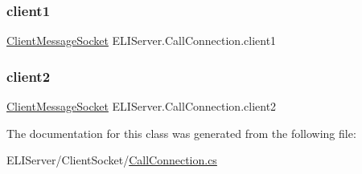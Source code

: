 \subsubsection{\texorpdfstring{client1}{client1}}
{\footnotesize\ttfamily \hyperlink{class_e_l_i_server_1_1_messaging_1_1_client_message_socket}{Client\+Message\+Socket} E\+L\+I\+Server.\+Call\+Connection.\+client1\hspace{0.3cm}{\ttfamily [private]}}

\mbox{\label{class_e_l_i_server_1_1_call_connection_af687483721642ebfcb3eaf00e586c7a1}} 
\subsubsection{\texorpdfstring{client2}{client2}}
{\footnotesize\ttfamily \hyperlink{class_e_l_i_server_1_1_messaging_1_1_client_message_socket}{Client\+Message\+Socket} E\+L\+I\+Server.\+Call\+Connection.\+client2\hspace{0.3cm}{\ttfamily [private]}}



The documentation for this class was generated from the following file\+:\begin{DoxyCompactItemize}
\item 
E\+L\+I\+Server/\+Client\+Socket/\hyperlink{_call_connection_8cs}{Call\+Connection.\+cs}\end{DoxyCompactItemize}
